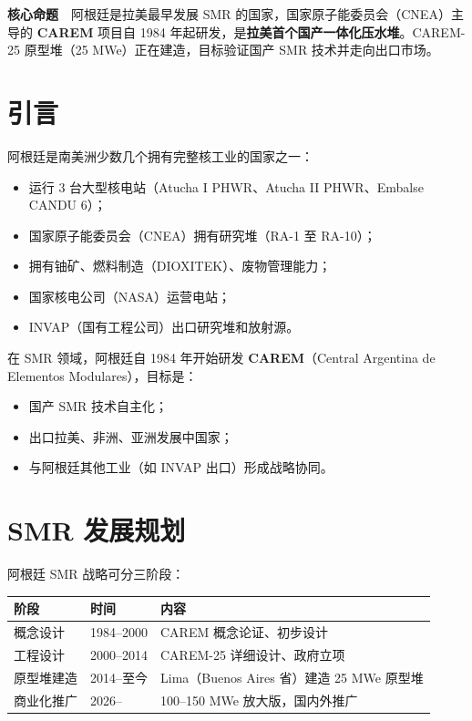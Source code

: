 \documentclass[
  UTF8,
  scheme=plain,
  fontsize=10pt,
  openany
]{ctexbook}
\begin{document}
\begin{epigraph}

\textbf{核心命题}　阿根廷是拉美最早发展 SMR
的国家，国家原子能委员会（CNEA）主导的 \textbf{CAREM} 项目自 1984
年起研发，是\textbf{拉美首个国产一体化压水堆}。CAREM-25 原型堆（25
MWe）正在建造，目标验证国产 SMR 技术并走向出口市场。

\end{epigraph}

\section{引言}\label{ux5f15ux8a00-15}

阿根廷是南美洲少数几个拥有完整核工业的国家之一：

\begin{itemize}
\tightlist
\item
  运行 3 台大型核电站（Atucha I PHWR、Atucha II PHWR、Embalse CANDU
  6）；
\item
  国家原子能委员会（CNEA）拥有研究堆（RA-1 至 RA-10）；
\item
  拥有铀矿、燃料制造（DIOXITEK）、废物管理能力；
\item
  国家核电公司（NASA）运营电站；
\item
  INVAP（国有工程公司）出口研究堆和放射源。
\end{itemize}

在 SMR 领域，阿根廷自 1984 年开始研发 \textbf{CAREM}（Central Argentina
de Elementos Modulares），目标是：

\begin{itemize}
\tightlist
\item
  国产 SMR 技术自主化；
\item
  出口拉美、非洲、亚洲发展中国家；
\item
  与阿根廷其他工业（如 INVAP 出口）形成战略协同。
\end{itemize}

\section{SMR 发展规划}\label{smr-ux53d1ux5c55ux89c4ux5212}

阿根廷 SMR 战略可分三阶段：

{\def\LTcaptype{none} %
\begin{longtable}[]{@{}lll@{}}
\toprule\noalign{}
阶段 & 时间 & 内容 \\
\midrule\noalign{}
\endhead
\bottomrule\noalign{}
\endlastfoot
概念设计 & 1984--2000 & CAREM 概念论证、初步设计 \\
工程设计 & 2000--2014 & CAREM-25 详细设计、政府立项 \\
原型堆建造 & 2014--至今 & Lima（Buenos Aires 省）建造 25 MWe 原型堆 \\
商业化推广 & 2026-- & 100--150 MWe 放大版，国内外推广 \\
\end{longtable}
}
\end{document}
